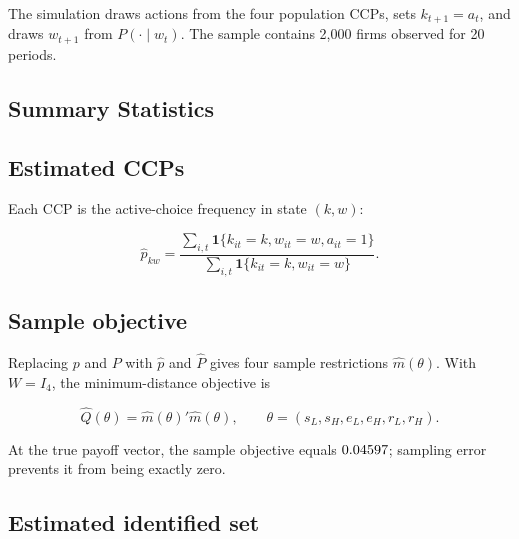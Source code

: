 \documentclass[10pt]{article}
\begin{document}
The simulation draws actions from the four population CCPs, sets $k_{t+1}=a_t$, and draws $w_{t+1}$ from $P(\cdot\mid w_t)$. The sample contains 2,000 firms observed for 20 periods.

\subsection{Summary Statistics}

\begin{table}[H]
    \centering
    \caption{State-level observations and active choices}
    
\end{table}

\subsection{Estimated CCPs}

Each CCP is the active-choice frequency in state $(k,w)$:

\begin{equation*}
\widehat p_{kw}
=\frac{\sum_{i,t}\mathbf 1\{k_{it}=k,w_{it}=w,a_{it}=1\}}
{\sum_{i,t}\mathbf 1\{k_{it}=k,w_{it}=w\}}.
\end{equation*}

\begin{table}[H]
    \centering
    \caption{Estimated and population CCPs}
    
\end{table}

\subsection{Sample objective}

Replacing $p$ and $P$ with $\widehat p$ and $\widehat P$ gives four sample restrictions $\widehat m(\theta)$. With $W=I_4$, the minimum-distance objective is

\begin{equation*}
\widehat Q(\theta)=\widehat m(\theta)'\widehat m(\theta),
\qquad
\theta=(s_L,s_H,e_L,e_H,r_L,r_H).
\end{equation*}

At the true payoff vector, the sample objective equals $0.04597$; sampling error prevents it from being exactly zero.

\subsection{Estimated identified set}
\end{document}
